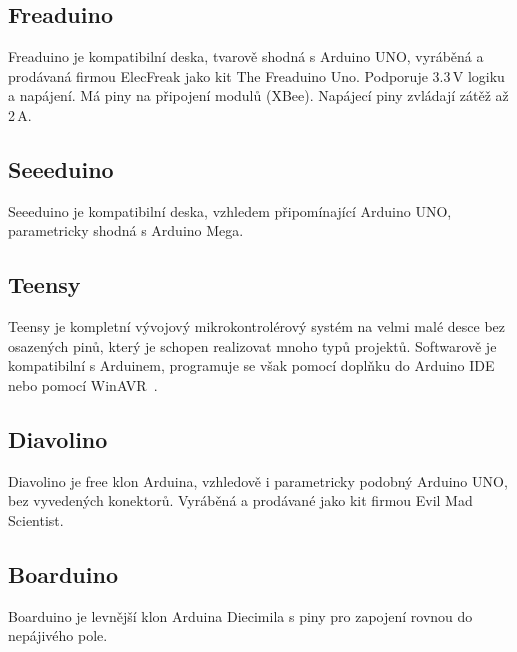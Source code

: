 	\subsection{Freaduino} 
	Freaduino je kompatibilní deska, tvarově shodná s Arduino UNO, vyráběná a prodávaná firmou ElecFreak jako kit The Freaduino Uno. Podporuje 3.3\,V logiku a napájení. Má piny na připojení modulů (XBee). Napájecí piny zvládají zátěž až 2\,A.
	
	\subsection{Seeeduino} 
	Seeeduino je kompatibilní deska, vzhledem připomínající Arduino UNO, parametricky shodná s Arduino Mega.
	
	\subsection{Teensy}
	Teensy je kompletní vývojový mikrokontrolérový systém na velmi malé desce bez osazených pinů, který je schopen realizovat mnoho typů projektů. Softwarově je kompatibilní s Arduinem, programuje se však pomocí doplňku do Arduino IDE nebo pomocí WinAVR~\cite{ArduinoTeensy}.
	
	\subsection{Diavolino} 
	Diavolino je free klon Arduina, vzhledově i parametricky podobný Arduino UNO, bez vyvedených konektorů. Vyráběná a prodávané jako kit firmou Evil Mad Scientist.
	
	\subsection{Boarduino} 
	Boarduino je levnější klon Arduina Diecimila s piny pro zapojení rovnou do nepájivého pole.




